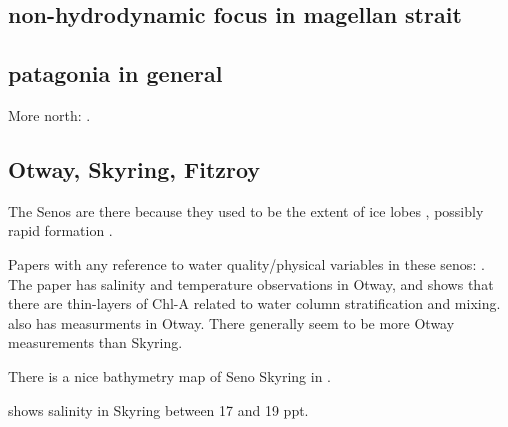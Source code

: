 \documentclass[11pt, oneside]{article}   	%
\begin{document}
\subsection*{non-hydrodynamic focus in magellan strait}

\citep{talbot1997meps}

\subsection{patagonia in general}

More north: \citep{narvaez19}.

\subsection{Otway, Skyring, Fitzroy}

The Senos are there because they used to be the extent of ice lobes \citep{darvill17}, possibly rapid formation \citep{lovell12}.

Papers with any reference to water quality/physical variables in these senos: \citep{mansilla13, rodriguez18, valdenegro03, rios16, mansilla13_AIP}. The \citet{rios16} paper has salinity and temperature observations in Otway, and shows that there are thin-layers of Chl-A related to water column stratification and mixing. \citep{cuevas19} also has measurments in Otway. There generally seem to be more Otway measurements than Skyring. 

There is a nice bathymetry map of Seno Skyring in \citep{breuer13}.

\citep{kilian07} shows salinity in Skyring between 17 and 19 ppt. 

{}

\end{document}
